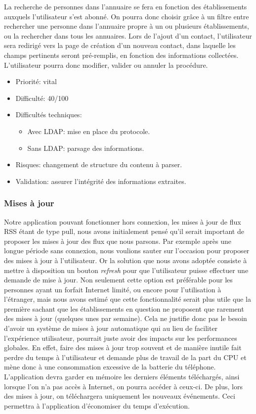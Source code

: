 \wl La recherche de personnes dans l'annuaire se fera en fonction des établissements auxquels l'utilisateur s'est abonné. On pourra donc choisir grâce à un filtre entre rechercher une personne dans l'annuaire propre à un ou plusieurs établissements, ou la rechercher dans tous les annuaires.
Lors de l'ajout d'un contact, l'utilisateur sera redirigé vers la page de création d'un nouveau contact, dans laquelle les champs pertinents seront pré-remplis, en fonction des informations collectées. L'utilisateur pourra donc modifier, valider ou annuler la procédure. \\

\begin{itemize}
\renewcommand{\labelitemi}{$\bullet$}
\item Priorité: vital
\item Difficulté: 40/100
\item Difficultés techniques:
\begin{itemize}
\item Avec LDAP: mise en place du protocole.
\item Sans LDAP: parsage des informations.
\end{itemize} 
\item Risques: changement de structure du contenu à parser.
\item Validation: assurer l'intégrité des informations extraites.
\end{itemize}

\subsubsection{Mises à jour}

Notre application pouvant fonctionner hors connexion, les mises à jour de flux RSS étant de type pull, nous avons initialement pensé qu'il serait important de proposer les mises à jour des flux que nous parsons. Par exemple après une longue période sans connexion, nous voulions sauter sur l'occasion pour proposer des mises à jour à l'utilisateur. Or la solution que nous avons adoptée consiste à mettre à disposition un bouton \emph{refresh} pour que l'utilisateur puisse effectuer une demande de mise à jour. Non seulement cette option est préférable pour les personnes ayant un forfait Internet limité, ou encore pour l'utilisation à l'étranger, mais nous avons estimé que cette fonctionnalité serait plus utile que la première sachant que les établissements en question ne proposent que rarement des mises à jour (quelques unes par semaine). Cela ne justifie donc pas le besoin d'avoir un système de mises à jour automatique qui au lieu de faciliter l'expérience utilisateur, pourrait juste avoir des impacts sur les performances globales. En effet, faire des mises à jour trop souvent et de manière inutile fait perdre du temps à l'utilisateur et demande plus de travail de la part du CPU et mène donc à une consommation excessive de la batterie du téléphone.
L'application devra garder en mémoire les derniers éléments téléchargés, ainsi lorsque l'on n'a pas accès à Internet, on pourra accéder à ceux-ci. De plus, lors des mises à jour, on téléchargera uniquement les nouveaux événements. Ceci permettra à l'application d'économiser du temps d'exécution. \\

